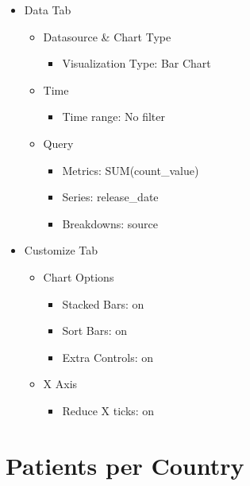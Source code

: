 \documentclass[
]{book}
\providecommand{\tightlist}{%
  \setlength{\itemsep}{0pt}\setlength{\parskip}{0pt}}
\begin{document}
\begin{itemize}
\item
  Data Tab

  \begin{itemize}
  \item
    Datasource \& Chart Type

    \begin{itemize}
    \tightlist
    \item
      Visualization Type: Bar Chart
    \end{itemize}
  \item
    Time

    \begin{itemize}
    \tightlist
    \item
      Time range: No filter
    \end{itemize}
  \item
    Query

    \begin{itemize}
    \item
      Metrics: SUM(count\_value)
    \item
      Series: release\_date
    \item
      Breakdowns: source
    \end{itemize}
  \end{itemize}
\item
  Customize Tab

  \begin{itemize}
  \item
    Chart Options

    \begin{itemize}
    \item
      Stacked Bars: on
    \item
      Sort Bars: on
    \item
      Extra Controls: on
    \end{itemize}
  \item
    X Axis

    \begin{itemize}
    \tightlist
    \item
      Reduce X ticks: on
    \end{itemize}
  \end{itemize}
\end{itemize}

\hypertarget{patients-per-country}{%
\section{Patients per Country}\label{patients-per-country}}
\end{document}
